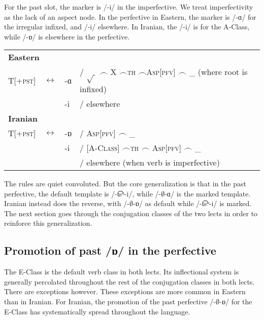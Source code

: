 For the past slot, the marker is /{-i}/ in the imperfective. We treat imperfectivity as the lack of an aspect node. In the perfective in Eastern, the marker is /{-ɑ}/ for  the irregular infixed, and /{-i}/ elsewhere. In Iranian, the /{-i}/ is for the A-Class, while /{-ɒ}/ is elsewhere in the perfective.

\begin{exe}
	
	\begin{tabular}{llll}
		\multicolumn{3}{l}{\textbf{Eastern}}
		\\
		\textsc{T[+pst]} & $\leftrightarrow$ & {{-ɑ}} & / $\sqrt{~}$ $\frown$ X $\frown$\textsc{th} $\frown$\textsc{Asp[pfv]} $\frown$ \_ (where root is infixed)
		\\
		&& {{-i}} & / elsewhere
		\\
		
		\multicolumn{3}{l}{\textbf{Iranian}}
		\\
		\textsc{T[+pst]} & $\leftrightarrow$ & {{-ɒ}} & / \textsc{Asp[pfv]} $\frown$ \_ 
		\\
		&& {{-i}} & / [\textsc{A-Class}] $\frown$\textsc{th} $\frown $ \textsc{Asp[pfv]} $\frown$ \_ 
		\\
		&&   & / elsewhere  (when verb is imperfective)
		
	\end{tabular}
\end{exe}

The  rules are quiet convoluted. But the core generalization is that in the past perfective, the default template is  /{-\t{ts}ʰ-i}/, while /{-$\emptyset$-ɑ}/ is the marked template. Iranian instead does the reverse, with     /{-$\emptyset$-ɒ}/ as default while  /{-\t{ts}ʰ-i}/ is marked.  The next section goes through the conjugation classes of the two lects in order to reinforce this generalization. 

\subsection{Promotion of past /{ɒ}/ in the perfective}\label{section:verb:past: pfv everywhere}
The E-Class is the default verb class in both lects. Its inflectional system is generally percolated throughout the rest of the conjugation classes in both lects.  There are exceptions however.  These exceptions are more common in Eastern than in Iranian. For Iranian, the promotion of the past perfective /{-$\emptyset$-ɒ}/  for the E-Class has systematically spread throughout the language. 


